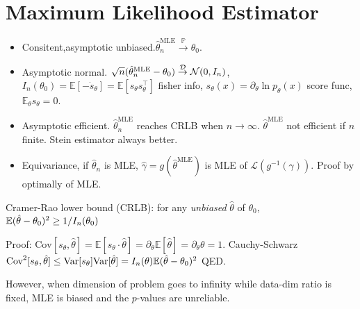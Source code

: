 \section{Maximum Likelihood Estimator}
\begin{itemize}[itemsep=0pt,topsep=0pt, leftmargin=2pt, itemindent=5pt, labelwidth=5pt]
    \item Consitent,asymptotic unbiased.$\hat{\theta}^{\mathrm{MLE}}_n\overset{\mathbb{P}}{\to}\theta_0$.
    \item Asymptotic normal. $\sqrt{n}(\hat{\theta}^{\mathrm{MLE}}_n-\theta_0) \overset{\mathcal{D}}{\to} \mathcal{N}(0, I_n)$, $I_n(\theta_0)= \mathbb{E}[- \dot{s}_\theta ] = \mathbb{E}[s_\theta s_\theta^{\top}]$ fisher info, $s_\theta(x) = \partial_\theta \ln p_\theta(x)$ score func, $\mathbb{E}_{\theta}s_\theta = 0$.
    \item Asymptotic efficient. $\hat{\theta}^{\mathrm{MLE}}_n$ reaches CRLB when $n\rightarrow \infty$. $\hat{\theta}^{\mathrm{MLE}}$ not  efficient if $n$ finite. Stein estimator always better.
    \item Equivariance, if $\hat{\theta}_n$ is MLE, $\hat{\gamma} = g(\hat{\theta}^{\mathrm{MLE}})$ is MLE of $\mathcal{L}(g^{-1}(\gamma))$. Proof by optimally of MLE.
\end{itemize}

Cramer-Rao lower bound (CRLB): for any \emph{unbiased} $\hat{\theta}$ of $\theta_0$, $\mathbb{E} (\hat{\theta}-\theta_0)^2 \ge 1/I_n(\theta_0)$

Proof: $\text{Cov}[s_\theta, \hat{\theta}] = \mathbb{E}[s_\theta \cdot \hat{\theta}] = \partial_\theta  \mathbb{E}[\hat{\theta}] = \partial_\theta \theta = 1$. Cauchy-Schwarz $\text{Cov}^2[s_\theta, \hat{\theta}]\leq \text{Var}[s_\theta] \text{Var}[\hat{\theta}] = I_n(\theta) \mathbb{E} (\hat{\theta}-\theta_0)^2$ QED.

However, when dimension of problem goes to infinity while data-dim ratio is fixed, MLE is biased and the $p$-values are unreliable. 
